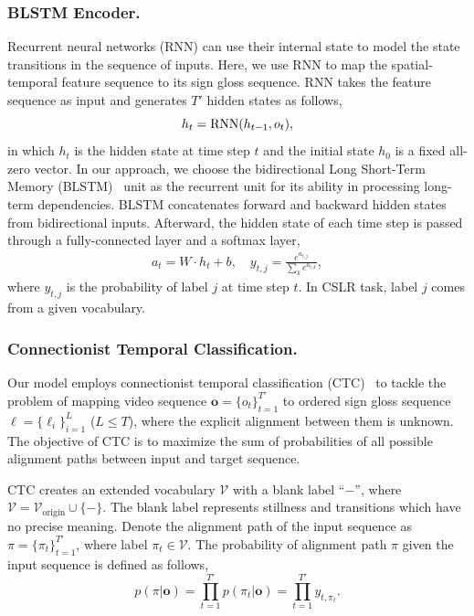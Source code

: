 \documentclass[letterpaper]{article} %
\def\lbf{{\boldsymbol\ell}}
\def\lnf{{\ell}}
\begin{document}
\subsubsection{BLSTM Encoder.}
Recurrent neural networks (RNN) can use their internal state to model the state transitions in the sequence of inputs. Here, we use RNN to map the spatial-temporal feature sequence to its sign gloss sequence. RNN takes the feature sequence as input and generates $T'$ hidden states as follows,
\begin{equation}
    h_t={\rm RNN}(h_{t-1}, o_t),
\end{equation}  
in which $h_t$ is the hidden state at time step $t$ and the initial state $h_0$ is a fixed all-zero vector. 
In our approach, we choose the bidirectional Long Short-Term Memory (BLSTM)~\cite{LSTM} unit as the recurrent unit for its ability in processing long-term dependencies. BLSTM concatenates forward and backward hidden states from bidirectional inputs. Afterward, the hidden state of each time step is passed through a fully-connected layer and a softmax layer,
\begin{equation}\label{rnn}
    \begin{split}
    a_t = W \cdot h_t+b, \quad
    y_{t,j}=\frac{e^{a_{t,j}}}{\sum_k e^{a_{t,k}}},
    \end{split}
\end{equation}
where $y_{t,j}$ is the probability of label $j$ at time step $t$. In CSLR task, label $j$ comes from a given vocabulary.

\subsubsection{Connectionist Temporal Classification.}
Our model employs connectionist temporal classification (CTC)~\cite{CTC} to tackle the problem of mapping video sequence $\mathbf{o}=\{o_t\}_{t=1}^{T'}$ to ordered sign gloss sequence $\lbf=\{\lnf_i\}_{i=1}^L$ ($L \le T$), where the explicit alignment between them is unknown. 
The objective of CTC is to maximize the sum of probabilities of all possible alignment paths between input and target sequence.

CTC creates an extended vocabulary $\mathcal{V}$ with a blank label ``\(-\)'', where $\mathcal{V}=\mathcal{V}_\text{origin} \cup \{-\}$. The blank label represents stillness and transitions which have no precise meaning. 
Denote the alignment path of the input sequence as $\pi = \{ \pi_t \}_{t=1}^{T'}$, where label $\pi_t \in \mathcal{V}$. The probability of alignment path $\pi$ given the input sequence is defined as follows,
\begin{equation}
    p(\pi | \mathbf{o}) = \prod_{t=1}^{T'} p(\pi_t | \mathbf{o})= \prod_{t=1}^{T'} y_{t,\pi_t}.
\end{equation}
\end{document}
